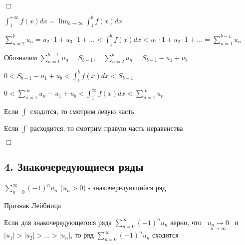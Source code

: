\documentclass[12pt]{article}
\begin{document}
    \begin{MyProof}
        $\Box$

        $\int_1^{+\infty} f(x) dx = \lim_{b \to \infty} \int_1^b f(x) dx$

        $\sum_{n = 2}^b u_n = u_2 \cdot 1 + u_3 \cdot 1 + \dots < \int_1^b f(x) dx < u_1 \cdot 1 + u_2 \cdot 1 + \dots = \sum_{n = 1}^{b - 1} u_n$

        Обозначим $\sum_{n = 1}^{b - 1} u_n = S_{b - 1}, \quad \sum_{n = 2}^{b} u_n = S_{b - 1} - u_1 + u_b$

        $0 < S_{b - 1} - u_1 + u_b < \int_1^b f(x) dx < S_{b - 1}$

        $0 < \sum_{n = 1}^{\infty} u_n - u_1 + u_b < \int_1^\infty f(x) dx < \sum_{n = 1}^\infty u_n$

        Если $\int$ сходится, то смотрим левую часть

        Если $\int$ расходится, то смотрим правую часть неравенства

        $\Box$
    \end{MyProof}

    \hypertarget{alternatingsignseries}{}

    \subsection{4. Знакочередующиеся ряды}

    \Def $\sum_{n = 0}^\infty (-1)^n u_n$ ($u_n > 0$) - знакочередующийся ряд

    \hypertarget{leibniztheorem}{}

    \begin{MyTheorem}
        \Ths Признак Лейбница

        Если для знакочередующегося ряда $\sum_{n = 0}^\infty (-1)^n u_n$ верно,
        что \ $\underset{n \to \infty}{u_n \to 0}$ \ и \ $|u_1| > |u_2| > \dots > |u_n|$,
        то ряд $\sum_{n = 0}^\infty (-1)^n u_n$ сходится
    \end{MyTheorem}

\end{document}

